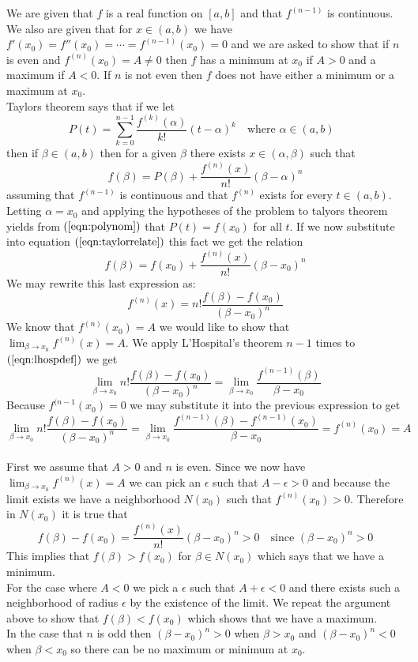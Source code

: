 \documentclass[11pt,reqno]{article}
\begin{document}
We are given that $f$ is a real function on $[a,b]$ and that $f^{(n-1)}$ is continuous. We also are given that for $x \in (a,b)$ we have $f'(x_0) = f''(x_0) = \cdots = f^{(n-1)}(x_0) = 0$ and we are asked to show that if $n$ is even and $f^{(n)}(x_0) = A \neq 0$ then $f$ has a minimum at $x_0$ if $A > 0$ and a maximum if $A < 0$. If $n$ is not even then $f$ does not have either a minimum or a maximum at $x_0$.\\
\indent Taylors theorem says that if we let
\begin{equation} 
P(t) = \sum^{n-1}_{k=0}\frac{f^{(k)}(\alpha)}{k!}(t - \alpha)^k \quad \text{where $\alpha \in (a,b)$ } \label{eqn:polynom}
\end{equation}
then if $\beta \in (a,b)$ then for a given $\beta$ there exists $x \in (\alpha,\beta)$ such that
\begin{equation} 
f(\beta) = P(\beta) + \frac{f^{(n)}(x)}{n!} (\beta-\alpha)^n \label{eqn:taylorrelate}
\end{equation}
assuming that $f^{(n-1)}$ is continuous and that $f^{(n)}$ exists for every $t \in (a,b)$.\\
\indent Letting $\alpha = x_0$ and applying the hypotheses of the problem to talyors theorem yields from $(\ref{eqn:polynom})$ that $P(t) = f(x_0)$ for all $t$. If we now substitute into equation $(\ref{eqn:taylorrelate})$ this fact we get the relation
\[ f(\beta) = f(x_0) + \frac{f^{(n)}(x)}{n!} (\beta-x_0)^n \]
We may rewrite this last expression as:
\begin{equation}
f^{(n)}(x) = n! \frac{f(\beta) - f(x_0)}{(\beta-x_0)^n} \label{eqn:lhospdef}
\end{equation}
We know that $f^{(n)}(x_0) = A$ we would like to show that $\lim_{\beta \to x_0} f^{(n)}(x) = A$. We apply L'Hospital's theorem $n-1$ times to $(\ref{eqn:lhospdef})$ we get
\[ \lim_{\beta \to x_0}  n! \frac{f(\beta) - f(x_0)}{(\beta-x_0)^n}  =  \lim_{\beta \to x_0}\frac{f^{(n-1)}(\beta) }{\beta-x_0} \]
Because $f^{(n-1}(x_0) = 0$ we may substitute it into the previous expression to get
\[ \lim_{\beta \to x_0}  n! \frac{f(\beta) - f(x_0)}{(\beta-x_0)^n}  = \lim_{\beta \to x_0} \frac{f^{(n-1)}(\beta) - f^{(n-1)}(x_0) }{\beta-x_0} = f^{(n)}(x_0) = A \]\\
\indent First we assume that $A > 0$ and $n$ is even. Since we now have $\lim_{\beta \to x_0} f^{(n)}(x) = A$ we can pick an $\epsilon$ such that $A - \epsilon > 0$ and because the limit exists we have a neighborhood $N(x_0)$ such that $f^{(n)}(x_0) > 0$. Therefore in $N(x_0)$ it is true that 
\[ f(\beta) - f(x_0) = \frac{f^{(n)}(x)}{n!} (\beta- x_0)^n  > 0 \quad \text{since $(\beta - x_0)^n > 0$}\]
This implies that $f(\beta) > f(x_0)$ for $\beta \in N(x_0)$ which says that we have a minimum.\\
\indent For the case where $A < 0$ we pick a $\epsilon$ such that $A + \epsilon < 0$ and there exists such a neighborhood of radius $\epsilon$ by the existence of the limit. We repeat the argument above to show that  $f(\beta) < f(x_0)$ which shows that we have a maximum.\\
\indent In the case that $n$ is odd then $(\beta - x_0)^n > 0$ when $\beta > x_0$ and $(\beta - x_0)^n < 0$
when $\beta < x_0$ so there can be no maximum or minimum at $x_0$.
\end{document}

